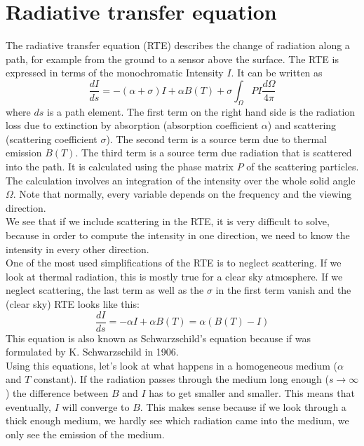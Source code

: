 \documentclass[a4paper,fleqn]{article}
\begin{document}
\section{Radiative transfer equation}
The radiative transfer equation (RTE) describes the change of radiation along a path,
for example from the ground to a sensor above the surface. The RTE is expressed in 
terms of the monochromatic Intensity $I$. It can be written as
\begin{equation}
	\frac{dI}{ds} = - (\alpha + \sigma)I + \alpha B(T) + \sigma \int_\Omega PI 
	\frac{d\Omega}{4\pi}
\end{equation}
where $ds$ is a path element. The first term on the right hand side is 
the radiation loss due to extinction by absorption (absorption coefficient $\alpha$) 
and scattering (scattering coefficient $\sigma$). The second term is a source term
due to thermal emission $B(T)$. The third term is a source term due radiation that
is scattered into the path. It is calculated using the phase matrix $P$ of the 
scattering particles. The calculation involves an integration of the intensity over the 
whole solid angle $\Omega$. Note that normally, every variable depends on the frequency
and the viewing direction. \\
We see that if we include scattering in the RTE, it is very difficult to solve, because 
in order to compute the intensity in one direction, we need to know the intensity in 
every other direction.\\
One of the most used simplifications of the RTE is to neglect scattering. If we look at
thermal radiation, this is mostly true for a clear sky atmosphere. If we neglect 
scattering, the last term as well as the $\sigma$ in the first term vanish and the 
(clear sky) RTE looks like this:
\begin{equation}
	\frac{dI}{ds} = -\alpha I + \alpha B(T) = \alpha ( B(T) - I )
\end{equation}
This equation is also known as Schwarzschild's equation because if was formulated by 
K. Schwarzschild in 1906.\\
Using this equations, let's look at what happens in a homogeneous medium ($\alpha$ and $T$
constant). If the radiation passes through the medium long enough ($s \rightarrow \infty$)
the difference between $B$ and $I$ has to get smaller and smaller. This means that eventually,
$I$ will converge to $B$. This makes sense because if we look through a thick enough medium, 
we hardly see which radiation came into the medium, we only see the emission of the medium.\\
\end{document}
